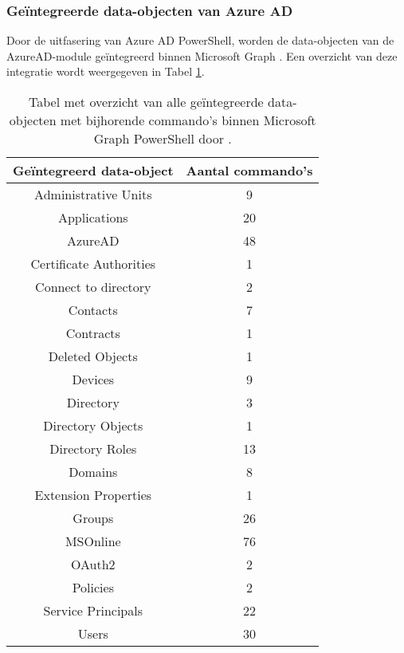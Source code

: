 \subsubsection{Geïntegreerde data-objecten van Azure AD}

Door de uitfasering van Azure \ac{AD} PowerShell, worden de data-objecten van de AzureAD-module geïntegreerd binnen Microsoft Graph \autocite{Microsoft2023l}. Een overzicht van deze integratie wordt weergegeven in Tabel \ref{MSGDOT}.

\begin{table}
    \small
    \centering
    \begin{tabular}{ |c|c| } 
        \hline
        \textbf{Geïntegreerd data-object} & \textbf{Aantal commando's} \\
        \hline
        Administrative Units & 9 \\ 
        Applications & 20 \\ 
        AzureAD & 48 \\ 
        Certificate Authorities & 1 \\ 
        Connect to directory & 2 \\ 
        Contacts & 7 \\ 
        Contracts & 1 \\ 
        Deleted Objects & 1 \\ 
        Devices & 9 \\    
        Directory & 3 \\
        Directory Objects & 1 \\ 
        Directory Roles & 13 \\ 
        Domains & 8 \\ 
        Extension Properties & 1 \\ 
        Groups & 26 \\
        MSOnline & 76 \\ 
        OAuth2 & 2 \\ 
        Policies & 2 \\ 
        Service Principals & 22 \\ 
        Users & 30 \\ 
        \hline
    \end{tabular}
    \caption[Tabel geïntegreerde data-objecten]{Tabel met overzicht van alle geïntegreerde data-objecten met bijhorende commando's binnen Microsoft Graph PowerShell door \textcite{Microsoft2023l}.}
    \label{MSGDOT}
\end{table}

